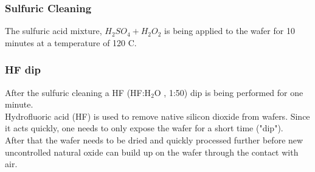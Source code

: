 \subsubsection{Sulfuric Cleaning}
The sulfuric acid mixture, $H_2 S O_4 + H_2 O_2$ is being applied to the wafer for 10 minutes at a temperature of 120 \degree C.

\subsubsection{HF dip}
After the sulfuric cleaning a HF (HF:H$_2$O , 1:50) dip is being performed for one minute. \\
Hydrofluoric acid (HF) is used to remove native silicon dioxide from wafers. Since it acts quickly, one needs to only expose the wafer for a short time ("dip"). \\
After that the wafer needs to be dried and quickly processed further before new uncontrolled natural oxide can build up on the wafer through the contact with air.